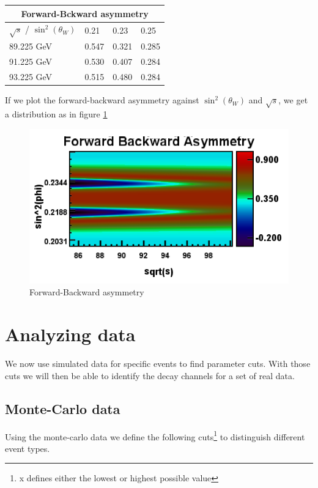 \documentclass[]{article}
\begin{document}
\begin{tabular}{ |p{3cm}||p{2cm}|p{2cm}|p{2cm}|  }
 \hline
 \multicolumn{4}{|c|}{Forward-Bckward asymmetry} \\
 \hline
 $\sqrt{s}$ / $\sin^2(\theta_W)$ & 0.21 & 0.23 & 0.25 \\
 \hline
   89.225 GeV & 0.547 & 0.321 & 0.285  \\
   91.225 GeV & 0.530 & 0.407 & 0.284  \\
   93.225 GeV & 0.515 & 0.480 & 0.284  \\
  \hline
\end{tabular}

If we plot the forward-backward asymmetry against $\sin^2(\theta_W)$ and $\sqrt{s}$, we get a distribution as in figure \ref{fig:for-back-asy}
\begin{figure}[H]
	\centering
	\includegraphics[scale=0.6]{forward_backward_symmetry}
	\caption{Forward-Backward asymmetry}
	\label{fig:for-back-asy}
\end{figure}

\section{Analyzing data}
We now use simulated data for specific events to find parameter cuts. With those cuts we will then be able to identify the decay channels for a set of real data.

\subsection{Monte-Carlo data}
Using the monte-carlo data we define the following cuts\footnote{x defines either the lowest or highest possible value} to distinguish different event types.
\end{document}
